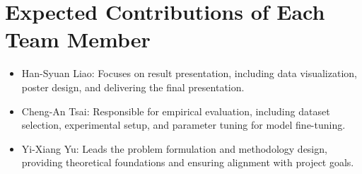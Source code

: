 \section{Expected Contributions of Each Team Member}
\begin{itemize}
    \item Han-Syuan Liao: Focuses on result presentation, including data visualization, poster design, and delivering the final presentation.
    \item Cheng-An Tsai: Responsible for empirical evaluation, including dataset selection, experimental setup, and parameter tuning for model fine-tuning.
    \item Yi-Xiang Yu: Leads the problem formulation and methodology design, providing theoretical foundations and ensuring alignment with project goals.
\end{itemize}